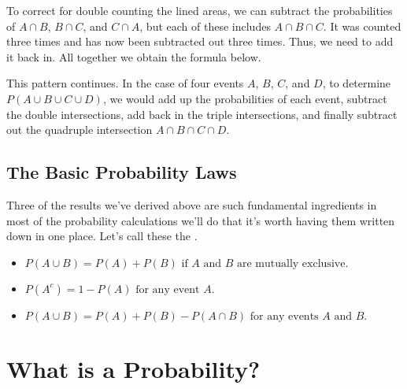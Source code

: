 \par
To correct for double counting the lined areas, we can subtract the probabilities of $A \cap B$, $B \cap C$, and $C \cap A$, but each of these includes $A \cap B \cap C$. It was counted three times and has now been subtracted out three times. Thus, we need to add it back in. All together we obtain the formula below.
\par
This pattern continues. In the case of four events $A$, $B$, $C$, and $D$, to determine $P(A \cup B \cup C \cup D)$, we would add up the probabilities of each event, subtract the double intersections, add back in the triple intersections, and finally subtract out the quadruple intersection $A \cap B \cap C \cap D$.

\subsection*{The Basic Probability Laws}

\par
Three of the results we've derived above are such fundamental ingredients in most of the probability calculations we'll do that it's worth having them written down in one place. Let's call these the .
\par
\begin{itemize}
\item $\boxed{P(A \cup B) = P(A) + P(B) \text{ if $A$ and $B$ are mutually exclusive.}}$
\item $\boxed{P(A^c) = 1- P(A) \text{ for any event $A$.}}$
\item $\boxed{P(A \cup B) = P(A) + P(B) - P(A \cap B) \text{ for any events $A$ and $B$.}}$
\end{itemize}

\section{What is a Probability?}\label{ProbInterpretationSection}

